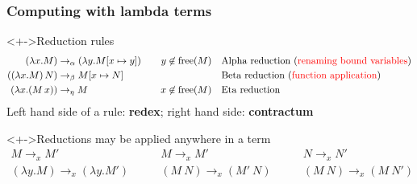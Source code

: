 \documentclass[pdftex,aspectratio=169]{beamer}
\begin{document}
\begin{frame}[fragile]
  \frametitle{Computing with lambda terms}
  \begin{block}<+->{Reduction rules}\VSPBLS
    \begin{alignat*}{2}
      (\lambda x.M) & \rightarrow_{\alpha} (\lambda y.M[x\mapsto y]) \quad 
      & y\not\in\operatorname{free}(M) & \quad\text{Alpha reduction (\textcolor{red}{renaming bound
      variables})}
      \\
      ((\lambda x.M)\,N) & \rightarrow_{\beta} M[x\mapsto N]
      && \quad\text{Beta reduction (\textcolor{red}{function application})}
      \\
      (\lambda x.(M\,x)) & \rightarrow_{\eta} M \quad
      & x\not\in\operatorname{free}(M) & \quad \text{Eta reduction}
    \end{alignat*}
    Left hand side of a rule: \textbf{redex}; right hand side: \textbf{contractum}
  \end{block}
  \begin{block}<+->{Reductions may be applied anywhere in a term}
    \begin{displaymath}
    \begin{array}{c}
      M \rightarrow_x M'
      \\\hline
      (\lambda y.M) \rightarrow_x (\lambda y.M')
    \end{array}
    \qquad
    \begin{array}{c}
      M \rightarrow_x M'
      \\\hline
      (M~N) \rightarrow_x (M'~N)
    \end{array}
    \qquad
    \begin{array}{c}
      N \rightarrow_x N'
      \\\hline
      (M~N) \rightarrow_x (M~N')
    \end{array}
  \end{displaymath}
  \end{block}
\end{frame}
\end{document}
